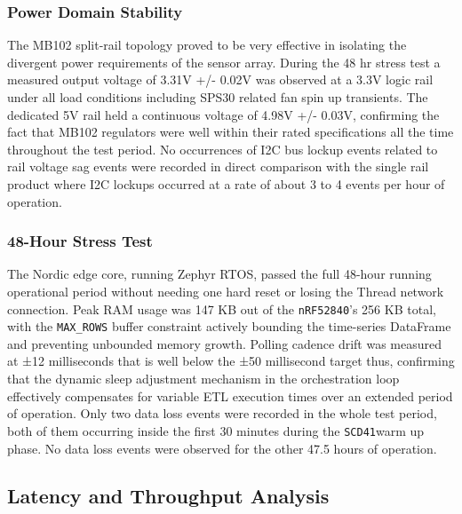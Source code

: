 \documentclass[conference]{IEEEtran}
\begin{document}
\subsubsection{Power Domain Stability}
The MB102 split-rail topology proved to be very effective in isolating the divergent power requirements of the sensor array. During the 48 hr stress test a measured output voltage of 3.31V +/- 0.02V was observed at a 3.3V logic rail under all load conditions including SPS30 related fan spin up transients. The dedicated 5V rail held a continuous voltage of 4.98V +/- 0.03V, confirming the fact that MB102 regulators were well within their rated specifications all the time throughout the test period. No occurrences of I2C bus lockup events related to rail voltage sag events were recorded in direct comparison with the single rail product where I2C lockups occurred at a rate of about 3 to 4 events per hour of operation.

\subsubsection{48-Hour Stress Test}
The Nordic edge core, running Zephyr RTOS, passed the full 48-hour running operational period without needing one hard reset or losing the Thread network connection. Peak RAM usage was 147 KB out of the \texttt{nRF52840}’s 256 KB total, with the \texttt{MAX\_ROWS} buffer constraint actively bounding the time-series DataFrame and preventing unbounded memory growth. Polling cadence drift was measured at ±12 milliseconds that is well below the ±50 millisecond target thus, confirming that the dynamic sleep adjustment mechanism in the orchestration loop effectively compensates for variable ETL execution times over an extended period of operation. Only two data loss events were recorded in the whole test period, both of them occurring inside the first 30 minutes during the \texttt{SCD41}warm up phase. No data loss events were observed for the other 47.5 hours of operation.

\subsection{Latency and Throughput Analysis}
\end{document}
